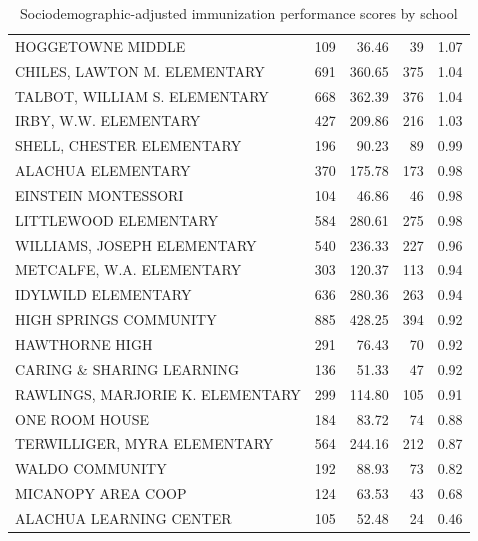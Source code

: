 \documentclass{article}
\begin{document}
\begin{multicols}{2}
\begin{table}[H]
\begin{table}[ht]
{\begin{tabular}{lrrrr}
  HOGGETOWNE MIDDLE  & 109 & 36.46 &  39 & 1.07 \\ 
  CHILES, LAWTON M. ELEMENTARY & 691 & 360.65 & 375 & 1.04 \\ 
  TALBOT, WILLIAM S. ELEMENTARY & 668 & 362.39 & 376 & 1.04 \\ 
  IRBY, W.W. ELEMENTARY & 427 & 209.86 & 216 & 1.03 \\ 
  SHELL, CHESTER ELEMENTARY & 196 & 90.23 &  89 & 0.99 \\ 
  ALACHUA ELEMENTARY & 370 & 175.78 & 173 & 0.98 \\ 
  EINSTEIN MONTESSORI  & 104 & 46.86 &  46 & 0.98 \\ 
  LITTLEWOOD ELEMENTARY & 584 & 280.61 & 275 & 0.98 \\ 
  WILLIAMS, JOSEPH ELEMENTARY & 540 & 236.33 & 227 & 0.96 \\ 
  METCALFE, W.A. ELEMENTARY & 303 & 120.37 & 113 & 0.94 \\ 
  IDYLWILD ELEMENTARY & 636 & 280.36 & 263 & 0.94 \\ 
  HIGH SPRINGS COMMUNITY  & 885 & 428.25 & 394 & 0.92 \\ 
  HAWTHORNE HIGH  & 291 & 76.43 &  70 & 0.92 \\ 
  CARING \& SHARING LEARNING & 136 & 51.33 &  47 & 0.92 \\ 
  RAWLINGS, MARJORIE K. ELEMENTARY & 299 & 114.80 & 105 & 0.91 \\ 
  ONE ROOM  HOUSE & 184 & 83.72 &  74 & 0.88 \\ 
  TERWILLIGER, MYRA ELEMENTARY & 564 & 244.16 & 212 & 0.87 \\ 
  WALDO COMMUNITY  & 192 & 88.93 &  73 & 0.82 \\ 
  MICANOPY AREA COOP  & 124 & 63.53 &  43 & 0.68 \\ 
  ALACHUA LEARNING CENTER & 105 & 52.48 &  24 & 0.46 \\ 
   \hline
\end{tabular}
}
\caption{Sociodemographic-adjusted immunization performance scores by school} 
\end{table}\end{table}



\begin{multicols}{2}

\end{multicols}
\begin{center}

\end{center}
\end{multicols}
\end{document}

